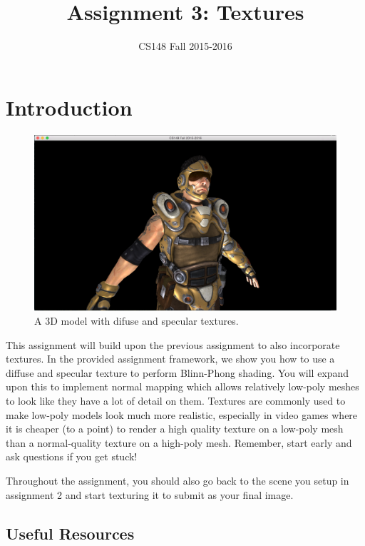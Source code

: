 \documentclass{article}
\begin{document}
\title{Assignment 3: Textures}
\author{CS148 Fall 2015-2016}
\date{}
\maketitle

\section*{Introduction}

\begin{figure}[h!]
    \centering\includegraphics[width=0.7\linewidth]{assign3.png}
    \caption{A 3D model with difuse and specular textures.}
\end{figure}

This assignment will build upon the previous assignment to also incorporate textures. In the provided assignment framework, we show you how to use a diffuse and specular texture to perform Blinn-Phong shading. You will expand upon this to implement normal mapping which allows relatively low-poly meshes to look like they have a lot of detail on them. Textures are commonly used to make low-poly models look much more realistic, especially in video games where it is cheaper (to a point) to render a high quality texture on a low-poly mesh than a normal-quality texture on a high-poly mesh. Remember, start early and ask questions if you get stuck!

Throughout the assignment, you should also go back to the scene you setup in assignment 2 and start texturing it to submit as your final image.

\subsection*{Useful Resources}
\end{document}
